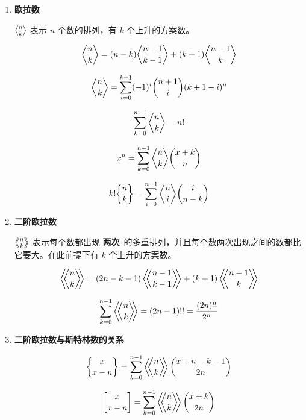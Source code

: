 \def \bangle{ \atopwithdelims \langle \rangle}

\begin{enumerate}

\item \textbf{欧拉数}

${n\bangle k}$ 表示 $n$ 个数的排列，有 $k$ 个上升的方案数。

$$ {n\bangle k} = (n - k){n - 1 \bangle k - 1} + (k + 1){n - 1 \bangle k} $$

$$ {n\bangle k} = \sum_{i = 0} ^ {k + 1} (-1)^i {n + 1\choose i} (k + 1 - i)^n $$

$$ \sum_{k = 0} ^ {n - 1} {n\bangle k} = n! $$

$$ x^n = \sum_{k = 0} ^ {n - 1} {n\bangle k} {x+k \choose n} $$

$$ k!{n\brace k} = \sum_{i = 0} ^ {n - 1} {n\bangle i} {i\choose n - k} $$

\item \textbf{二阶欧拉数}

$\left\langle\!\!{n\bangle k}\!\!\right\rangle$ 表示每个数都出现 \textbf{两次}\ 的多重排列，并且每个数两次出现之间的数都比它要大。在此前提下有 $k$ 个上升的方案数。

$$ \left\langle\!\!{n\bangle k}\!\!\right\rangle = (2n-k-1)\left\langle\!\!{n-1\bangle k-1}\!\!\right\rangle + (k+1)\left\langle\!\!{n-1 \bangle k}\!\!\right\rangle $$

$$ \sum_{k = 0} ^ {n - 1} \left\langle\!\!{n\bangle k}\!\!\right\rangle = (2n-1)!! = \frac{(2n)^{\underline n}} {2^n} $$

\item \textbf{二阶欧拉数与斯特林数的关系}

$$ {x \brace x-n} = \sum_{k = 0} ^ {n - 1} \left\langle\!\!{n\bangle k}\!\!\right\rangle {x + n - k - 1 \choose 2n} $$

$$ {x \brack x-n} = \sum_{k = 0} ^ {n - 1} \left\langle\!\!{n\bangle k}\!\!\right\rangle {x + k \choose 2n} $$

\end{enumerate}
